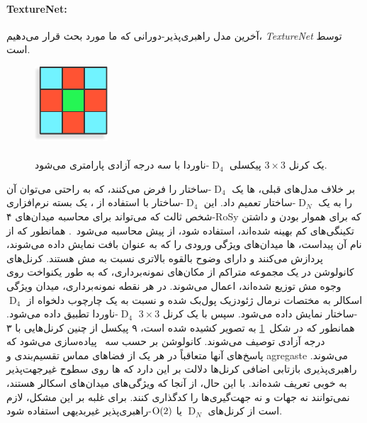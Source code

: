 \paragraph{TextureNet:}
آخرین مدل راهبری‌پذیر-دورانی که ما مورد بحث قرار می‌دهیم، \emph{TextureNet} توسط \citet{huang2019texturenet} است.
\begin{figure}
    \centering
    \includegraphics[width=.16\textwidth]{figures/3x3_D4_invariant_kernel.pdf}
    \captionsetup{width=.21\textwidth}
    \caption{\small
        \\
        یک کرنل $3\times3$ پیکسلی $\operatorname{D}_4$-ناوردا با سه درجه آزادی پارامتری می‌شود.
    }
    \label{fig:3x3_D4_invariant_kernel}
\end{figure}%
بر خلاف مدل‌های قبلی، ها یک $\operatorname{D}_4$-ساختار را فرض می‌کنند، که به راحتی می‌توان آن را به یک $\operatorname{D}_N$-ساختار تعمیم داد.
این $\operatorname{D}_4$-ساختار با استفاده از ، یک بسته نرم‌افزاری شخص ثالث که می‌تواند برای محاسبه میدان‌های ۴-RoSy که برای هموار بودن و داشتن تکینگی‌های کم بهینه شده‌اند، استفاده شود، از پیش محاسبه می‌شود~\cite{Huang2018QuadriFlow}.
همانطور که از نام آن پیداست، ها میدان‌های ویژگی ورودی را که به عنوان بافت نمایش داده می‌شوند، پردازش می‌کنند و دارای وضوح بالقوه بالاتری نسبت به مش هستند.
کرنل‌های کانولوشن در یک مجموعه متراکم از مکان‌های نمونه‌برداری، که به طور یکنواخت روی وجوه مش توزیع شده‌اند، اعمال می‌شوند.
در هر نقطه نمونه‌برداری، میدان ویژگی اسکالر به مختصات نرمال ژئودزیک پول‌بک شده و نسبت به یک چارچوب دلخواه از $\operatorname{D}_4$-ساختار نمایش داده می‌شود.
سپس با یک کرنل $3\times3$ $\operatorname{D}_4$-ناوردا تطبیق داده می‌شود.
همانطور که در شکل~\ref{fig:3x3_D4_invariant_kernel} به تصویر کشیده شده است، ۹ پیکسل از چنین کرنل‌هایی با ۳ درجه آزادی توصیف می‌شوند.
کانولوشن بر حسب سه \onexone\ پیاده‌سازی می‌شود که پاسخ‌های آنها متعاقباً در هر یک از فضاهای مماس تقسیم‌بندی و agregaste می‌شوند.
راهبری‌پذیری بازتابی اضافی کرنل‌ها دلالت بر این دارد که ها روی سطوح غیرجهت‌پذیر به خوبی تعریف شده‌اند.
با این حال، از آنجا که ویژگی‌های  میدان‌های اسکالر هستند، نمی‌توانند نه جهات و نه جهت‌گیری‌ها را کدگذاری کنند.
برای غلبه بر این مشکل، لازم است از کرنل‌های $\operatorname{D}_N$ یا $\operatorname{O}(2)$-راهبری‌پذیر غیربدیهی استفاده شود.